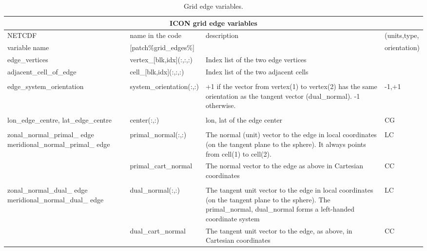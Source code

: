 \documentclass[a4paper,11pt,DIV16,BCOR1cm,titlepage]{scrartcl}
\begin{document}
\begin{table}[htdp]
\small
\begin{center}
\begin{tabular}{|m{3.2cm}|m{3.2cm}|m{6.8cm}|m{1.6cm}|}
\hline
\multicolumn{4}{|c|}{\textbf{ICON grid edge variables}}\\ \hline
NETCDF         & name in the code        & description & (units,type,    \\ 
variable name  & [patch\%grid\_edges\%]  &             &  orientation)    \\ 
\hline\hline
edge\_vertices  & vertex\_[blk,idx](:,:,:)  & Index list of the two edge vertices & \\
adjacent\_cell\_of\_edge  & cell\_[blk,idx](:,:,:)  & Index list of the two adjacent cells & \\
& & & \\
edge\_system\_\linebreak orientation  & system\_orientation(:,:)
& +1 if the vector from vertex(1) to vertex(2)
has the same orientation as the tangent vector (dual\_normal).
-1 otherwise.
& -1,+1\\
& & & \\
lon\_edge\_centre, lat\_edge\_centre & center(:,:) & lon, lat of the edge center & CG \\
& & & \\
zonal\_normal\_primal\_ edge \linebreak meridional\_normal\_\linebreak primal\_ edge
& primal\_normal(:,:)
& The normal (unit) vector to the edge in local coordinates
(on the tangent plane to the sphere).
It always points from cell(1) to cell(2). 
& LC \\
& primal\_cart\_normal
& The normal vector to the edge as above in Cartesian coordinates
& CC \\
& & & \\
zonal\_normal\_dual\_ edge \linebreak meridional\_normal\_\linebreak dual\_ edge
& dual\_normal(:,:)
& The tangent unit vector to the edge in local coordinates
(on the tangent plane to the sphere).
The primal\_normal, dual\_normal forms a left-handed coordinate system 
& LC \\
& dual\_cart\_normal
& The tangent unit vector to the edge, as above, in Cartesian coordinates
& CC \\
\hline
\end{tabular}
\caption{Grid edge variables.}\label{tbl:grid_edge_variables}
\end{center}
\end{table}
\end{document}
